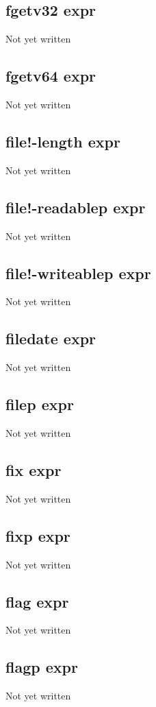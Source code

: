 \documentclass[a4paper,11pt]{article}
\begin{document}
\subsection{\ttfamily fgetv32 expr}
Not yet written

\subsection{\ttfamily fgetv64 expr}
Not yet written

\subsection{\ttfamily file!-length expr}
Not yet written

\subsection{\ttfamily file!-readablep expr}
Not yet written

\subsection{\ttfamily file!-writeablep expr}
Not yet written

\subsection{\ttfamily filedate expr}
Not yet written

\subsection{\ttfamily filep expr}
Not yet written

\subsection{\ttfamily fix expr}
Not yet written

\subsection{\ttfamily fixp expr}
Not yet written

\subsection{\ttfamily flag expr}
Not yet written

\subsection{\ttfamily flagp expr}
Not yet written
\end{document}
